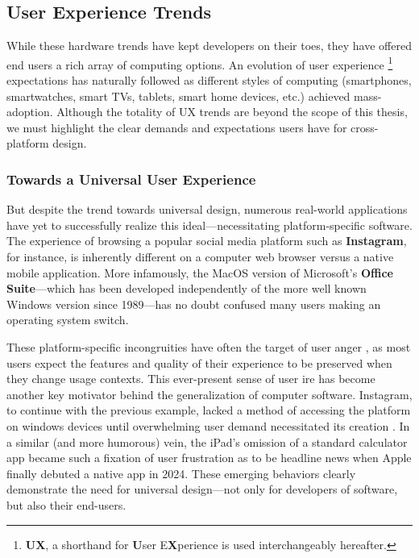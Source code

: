 \documentclass{report}
\newcommand{\tech}[1]{\textbf{#1}}
\begin{document}
\subsection{User Experience Trends}
While these hardware trends have kept developers on their toes, they have offered end users a rich array of computing options. An evolution of user experience \footnote{\textbf{UX}, a shorthand for \textbf{U}ser E\textbf{X}perience is used interchangeably hereafter.} expectations has naturally followed as different styles of computing (smartphones, smartwatches, smart TVs, tablets, smart home devices, etc.) achieved mass-adoption. Although the totality of UX trends are beyond the scope of this thesis, we must highlight the clear demands and expectations users have for cross-platform design. 

\subsubsection{Towards a Universal User Experience}
But despite the trend towards universal design, numerous real-world applications have yet to successfully realize this ideal---necessitating platform-specific software. The experience of browsing a popular social media platform such as \tech{Instagram}, for instance, is inherently different on a computer web browser versus a native mobile application. More infamously, the MacOS version of Microsoft's \tech{Office Suite}---which has been developed independently of the more well known Windows version since 1989---has no doubt confused many users making an operating system switch.

These platform-specific incongruities have often the target of user anger \cite{Paquin_2010}, as most users expect the features and quality of their experience to be preserved when they change usage contexts. This ever-present sense of user ire has become another key motivator behind the generalization of computer software. Instagram, to continue with the previous example, lacked a method of accessing the platform on windows devices until overwhelming user demand necessitated its creation \cite{Warren2013}. In a similar (and more humorous) vein, the iPad's omission of a standard calculator app became such a fixation of user frustration as to be headline news \cite{Weinstein_2024} when Apple finally debuted a native app in 2024. These emerging behaviors clearly demonstrate the need for universal design---not only for developers of software, but also their end-users. 
\end{document}
